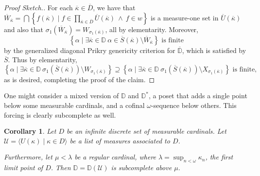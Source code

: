 \documentclass{amsart}
\newtheorem{corollary}[theorem]{Corollary}
\theoremstyle{definition}
\theoremstyle{remark}
\newcommand{\D}{\mathbb{D}}
\renewcommand{\S}{{\overline{S}}}
\newcommand{\U}{\mathcal{U}}
\newcommand{\st}{\; | \;}
\newcommand{\set}[2]{\left\{#1\st #2 \right\}}
\newcommand{\seq}[2]{\langle #1 \st #2 \rangle}
\begin{document}
\begin{proof}[Proof Sketch.]
For each $\overline \kappa \in \overline D$, we have that $\overline W_{\overline \kappa} = \bigcap \set{f(\overline \kappa) }{ f \in \prod_{\overline \kappa \in \overline D} \overline U(\overline \kappa) \ \land \ f \in w }$ is a measure-one set in $\overline U(\overline \kappa)$ and also that $\sigma_1(\overline W_{\overline \kappa}) = W_{\sigma_1(\overline \kappa)}$, all by elementarity. Moreover, 
$$\set{ \alpha }{ \exists \overline \kappa \in \D \ \alpha \in \overline S(\overline \kappa) \setminus \overline W_{\overline \kappa} } \text{ is finite}$$ by the generalized diagonal Prikry genericity criterion for $\overline{\D}$, which is satisfied by $\overline S$.
Thus by elementarity,
$$\set{ \alpha }{ \exists \overline \kappa \in \D \ \sigma_1(\S(\overline \kappa)) \setminus W_{\sigma_1(\overline \kappa)} } \supseteq \set{ \alpha }{ \exists \overline \kappa \in \D \ \sigma_1(\S(\overline \kappa)) \setminus X_{\sigma_1(\overline \kappa)}} \text{ is finite,}$$
as is desired, completing the proof of the claim. 
\end{proof}

One might consider a mixed version of $\D$ and $\D^*$, a poset that adds a single point below some measurable cardinals, and a cofinal $\omega$-sequence below others. This forcing is clearly subcomplete as well.

\begin{corollary} Let $D$ be an infinite discrete set of measurable cardinals. Let $\U = \seq{ U(\kappa) }{ \kappa \in D }$ be a list of measures associated to $D$. 

Furthermore, let $\mu < \lambda$ be a regular cardinal, where $\lambda = \sup_{n<\omega} \kappa_n$, the first limit point of $D$.
Then $\D=\D(\U)$ is subcomplete above $\mu$. \end{corollary}
\end{document}

